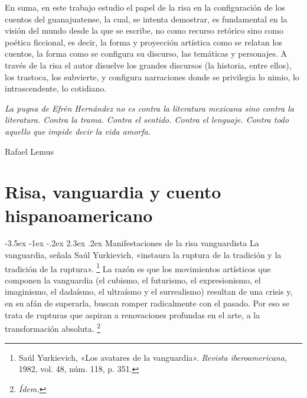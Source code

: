 \documentclass[14pt,twoside,final]{extbook} %
\makeatletter
\let\oldfootnote\footnote
\renewcommand\footnote[1]{%
\oldfootnote{\hspace{1mm}#1}}
\renewcommand\section{\@startsection {section}{1}{\z@}%
                                     {-3.5ex \@plus -1ex \@minus -.2ex}%
                                     {2.3ex \@plus .2ex}%
                                     {\normalfont\large\bfseries\sc}}
\makeatother
\begin{document}
En suma, en este trabajo estudio el papel de la risa en la configuración de los cuentos del guanajuatense, la cual, se intenta demostrar, es fundamental en la visión del mundo desde la que se escribe, no como recurso retórico sino como poética ficcional, es decir, la forma y proyección artística como se relatan los cuentos, la forma como se configura su discurso, las temáticas y personajes. A través de la risa el autor disuelve los grandes discursos (la historia, entre ellos), los trastoca, los subvierte, y configura narraciones donde se privilegia lo nimio, lo intrascendente, lo cotidiano.
\cleardoublepage
\newpage
\pagestyle{empty}
\vspace*{42pt}
\begin{flushright}
\begin{minipage}{7.5cm}
\emph{La pugna de Efrén Hernández no es contra la literatura mexicana sino contra la literatura. Contra la trama. Contra el sentido. Contra el lenguaje. Contra todo aquello que impide decir la vida amorfa.}
\begin{flushright}
Rafael Lemus
\end{flushright}
\end{minipage}
\end{flushright}
\chapter[\textsc{Risa, vanguardia y cuento hispanoamericano}]{Risa, vanguardia y cuento hispanoamericano}\label{ch:risa-vanguardia-y-cuento-hispanoamericano}
\BgThispage
\thispagestyle{empty}
\pagestyle{fancy}
\fancyhf{} %
\fancyhead[RO,LE]{\thepage}
\renewcommand{\headrulewidth}{0pt}
\section{Manifestaciones de la risa vanguardista}\label{sec:manifestaciones-de-la-risa-vanguardista}
La vanguardia, señala Saúl Yurkievich, «instaura la ruptura de la tradición y la tradición de la ruptura».\footnote{Saúl Yurkievich, «Los avatares de la vanguardia». \emph{Revista iberoamericana,} 1982, vol. 48, núm. 118, p. 351.} La razón es que los movimientos artísticos que componen la vanguardia (el cubismo, el futurismo, el expresionismo, el imaginismo, el dadaísmo, el ultraísmo y el surrealismo) resultan de una crisis y, en su afán de superarla, buscan romper radicalmente con el pasado. Por eso se trata de rupturas que aspiran a renovaciones profundas en el arte, a la transformación absoluta.\footnote{\em Ídem.}
\end{document}
